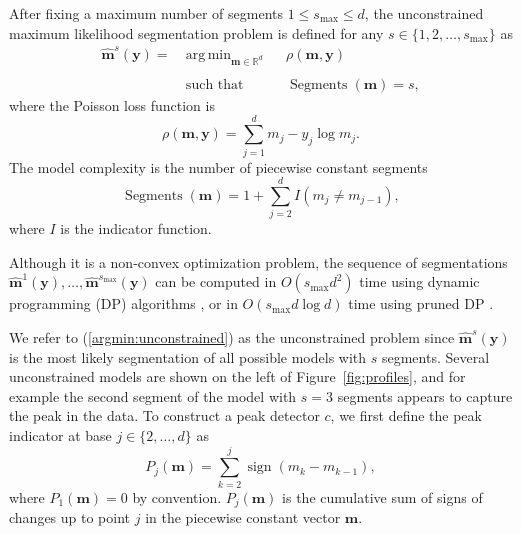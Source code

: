 \documentclass{article}
\DeclareMathOperator*{\argmin}{arg\,min}
\DeclareMathOperator*{\sign}{sign}
\DeclareMathOperator*{\Segments}{Segments}
\newcommand{\RR}{\mathbb R}
\begin{document}
After fixing a maximum number of segments $1 \leq s_{\text{max}}\leq d$,
the unconstrained maximum likelihood segmentation problem is defined
for any $s\in\{1, 2, \dots, s_{\max}\}$ as
\begin{equation}
  \label{argmin:unconstrained}
  \begin{aligned}
    \mathbf{\hat m}^s(\mathbf y)  =\ 
    &\argmin_{\mathbf m\in\RR^{d}} && 
    \rho
    (\mathbf m, \mathbf y) \\
    \\
    &\text{such that} && \Segments(\mathbf m)=s,
  \end{aligned}
\end{equation}
where the Poisson loss function is
\begin{equation}
  \rho(\mathbf m, \mathbf y)= \sum_{j=1}^d m_j - y_j \log m_j.
\end{equation} 
The model complexity is the number of piecewise constant segments
\begin{equation}
  \Segments(\mathbf m)=1+\sum_{j=2}^d I(m_j \neq m_{j-1}),
\end{equation}
where $I$ is the indicator function. 

Although it
is a non-convex optimization problem, the sequence of segmentations
$\mathbf{\hat m}^1(\mathbf y), \dots, \mathbf{\hat
  m}^{s_{\text{max}}}(\mathbf y)$ can be computed in $O(s_{\text{max}}
d^2)$ time using dynamic programming (DP) algorithms \citep{bellman},
or in $O(s_{\text{max}} d \log d)$ time using pruned DP
\citep{pruned-dp, Segmentor}.

We refer to (\ref{argmin:unconstrained}) as the unconstrained problem
since $\mathbf{\hat m}^s(\mathbf y)$ is the most likely segmentation
of all possible models with $s$ segments. Several unconstrained models
are shown on the left of Figure~\ref{fig:profiles}, and for example
the second segment of the model with $s=3$ segments appears to capture
the peak in the data. 
To construct a peak detector $c$, we first define the peak indicator at base
$j\in\{2, \dots, d\}$ as
\begin{equation}
  \label{eq:peaks}
  P_j(\mathbf m) = \sum_{k=2}^j \sign( m_{k} - m_{k-1} ),
\end{equation}
where $P_1(\mathbf m)=0$ by convention. $P_j(\mathbf m)$ is the
cumulative sum of signs of changes up to point $j$ in the piecewise constant
vector $\mathbf m$. 
\end{document}

